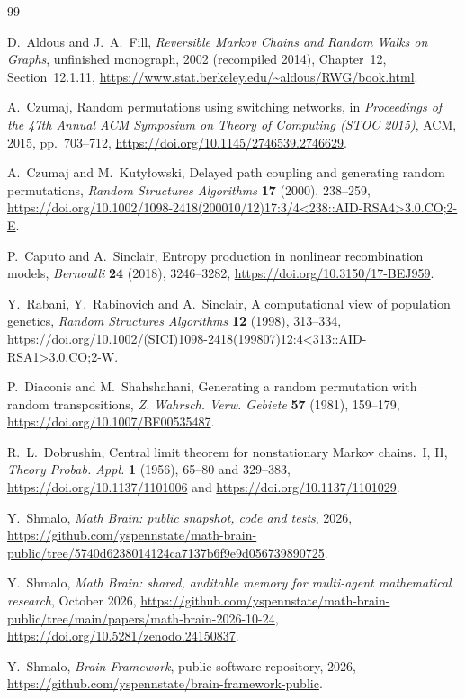 \documentclass[11pt]{amsart}
\theoremstyle{remark}
\numberwithin{equation}{section}
\begin{document}
\begin{thebibliography}{99}

 D.~Aldous and J.~A.~Fill, \emph{Reversible Markov Chains and Random Walks on Graphs}, unfinished monograph, 2002 (recompiled 2014), Chapter~12, Section~12.1.11, \url{https://www.stat.berkeley.edu/~aldous/RWG/book.html}.

 A.~Czumaj, Random permutations using switching networks, in \emph{Proceedings of the 47th Annual ACM Symposium on Theory of Computing (STOC 2015)}, ACM, 2015, pp.~703--712, \url{https://doi.org/10.1145/2746539.2746629}.

 A.~Czumaj and M.~Kuty{\l}owski, Delayed path coupling and generating random permutations, \emph{Random Structures Algorithms} \textbf{17} (2000), 238--259, \url{https://doi.org/10.1002/1098-2418(200010/12)17:3/4<238::AID-RSA4>3.0.CO;2-E}.

 P.~Caputo and A.~Sinclair, Entropy production in nonlinear recombination models, \emph{Bernoulli} \textbf{24} (2018), 3246--3282, \url{https://doi.org/10.3150/17-BEJ959}.

 Y.~Rabani, Y.~Rabinovich and A.~Sinclair, A computational view of population genetics, \emph{Random Structures Algorithms} \textbf{12} (1998), 313--334, \url{https://doi.org/10.1002/(SICI)1098-2418(199807)12:4<313::AID-RSA1>3.0.CO;2-W}.

 P.~Diaconis and M.~Shahshahani, Generating a random permutation with random transpositions, \emph{Z. Wahrsch. Verw. Gebiete} \textbf{57} (1981), 159--179, \url{https://doi.org/10.1007/BF00535487}.

 R.~L.~Dobrushin, Central limit theorem for nonstationary Markov chains.~I, II, \emph{Theory Probab. Appl.} \textbf{1} (1956), 65--80 and 329--383, \url{https://doi.org/10.1137/1101006} and \url{https://doi.org/10.1137/1101029}.

 Y.~Shmalo, \emph{Math Brain: public snapshot, code and tests}, 2026, \url{https://github.com/yspennstate/math-brain-public/tree/5740d6238014124ca7137b6f9e9d056739890725}.

 Y.~Shmalo, \emph{Math Brain: shared, auditable memory for multi-agent mathematical research}, October 2026, \url{https://github.com/yspennstate/math-brain-public/tree/main/papers/math-brain-2026-10-24}, \url{https://doi.org/10.5281/zenodo.24150837}.

 Y.~Shmalo, \emph{Brain Framework}, public software repository, 2026, \url{https://github.com/yspennstate/brain-framework-public}.

\end{thebibliography}
\end{document}
